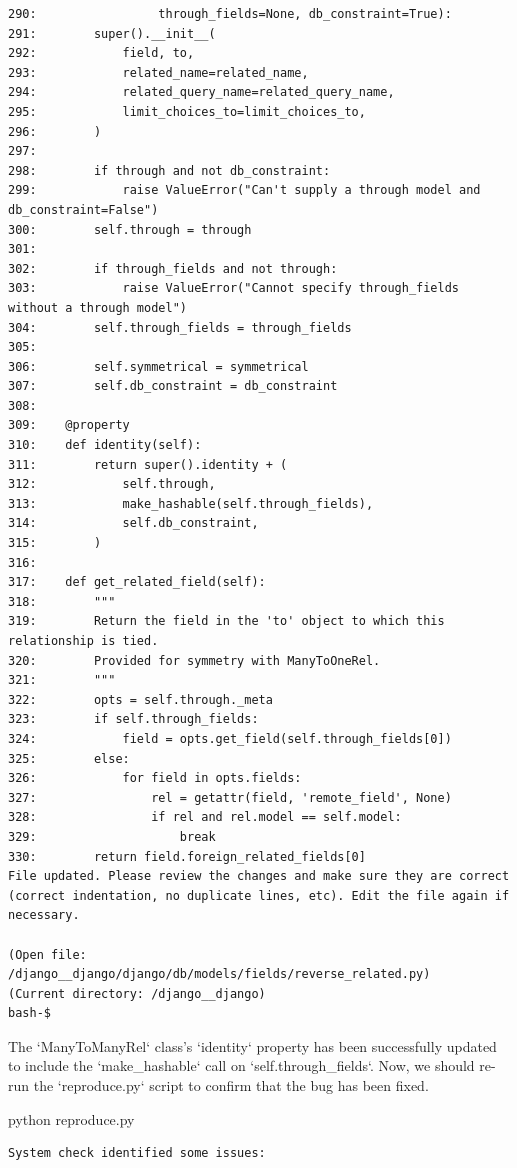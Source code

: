 {\begin{observationbox}
\begin{Verbatim}[breaklines=true, breakanywhere=true]
290:                 through_fields=None, db_constraint=True):
291:        super().__init__(
292:            field, to,
293:            related_name=related_name,
294:            related_query_name=related_query_name,
295:            limit_choices_to=limit_choices_to,
296:        )
297:
298:        if through and not db_constraint:
299:            raise ValueError("Can't supply a through model and db_constraint=False")
300:        self.through = through
301:
302:        if through_fields and not through:
303:            raise ValueError("Cannot specify through_fields without a through model")
304:        self.through_fields = through_fields
305:
306:        self.symmetrical = symmetrical
307:        self.db_constraint = db_constraint
308:
309:    @property
310:    def identity(self):
311:        return super().identity + (
312:            self.through,
313:            make_hashable(self.through_fields),
314:            self.db_constraint,
315:        )
316:
317:    def get_related_field(self):
318:        """
319:        Return the field in the 'to' object to which this relationship is tied.
320:        Provided for symmetry with ManyToOneRel.
321:        """
322:        opts = self.through._meta
323:        if self.through_fields:
324:            field = opts.get_field(self.through_fields[0])
325:        else:
326:            for field in opts.fields:
327:                rel = getattr(field, 'remote_field', None)
328:                if rel and rel.model == self.model:
329:                    break
330:        return field.foreign_related_fields[0]
File updated. Please review the changes and make sure they are correct (correct indentation, no duplicate lines, etc). Edit the file again if necessary.

(Open file: /django__django/django/db/models/fields/reverse_related.py)
(Current directory: /django__django)
bash-$
\end{Verbatim}
\end{observationbox}
\begin{agentbox}
The `ManyToManyRel` class's `identity` property has been successfully updated to include the `make\_hashable` call on `self.through\_fields`. Now, we should re-run the `reproduce.py` script to confirm that the bug has been fixed.



\hrulefill
\begin{CodeVerbatim}[breaklines=true, breakanywhere=true]
python reproduce.py
\end{CodeVerbatim}
\end{agentbox}
\begin{observationbox}\begin{Verbatim}[breaklines=true, breakanywhere=true]
System check identified some issues:


\end{Verbatim}
\end{observationbox}}
